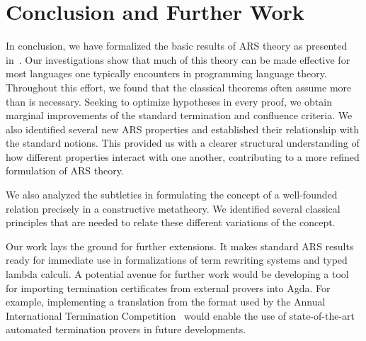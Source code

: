 \section{Conclusion and Further Work}
\label{sec:Conclusion}

In conclusion, we have formalized the basic results of ARS theory as
presented in~\cite{Terese}.  Our investigations show that much of this
theory can be made effective for most languages one typically encounters
in programming language theory.
Throughout this effort, we found that the classical theorems often assume
  more than is necessary.
  Seeking to optimize hypotheses in every proof, we obtain marginal improvements of the standard
termination and confluence criteria.
We also identified several new ARS properties
and established their relationship with the standard notions.
This provided us with a
clearer structural understanding of how different properties interact
with one another, contributing to a more refined %
formulation of ARS theory.

We also analyzed the subtleties in formulating the concept of a well-founded relation
precisely in a constructive metatheory.  We identified several classical principles
that are needed to relate these different variations of the concept.

Our work lays the ground for further extensions.  It makes standard ARS results
ready for immediate use in formalizations of term rewriting systems and typed
lambda calculi.  A potential avenue for further work would be developing a tool for 
importing termination certificates from external provers into Agda. 
For example, implementing a translation from the format used by 
the Annual International Termination Competition~\cite{AITC}
would enable the use of state-of-the-art automated termination provers in future developments.



